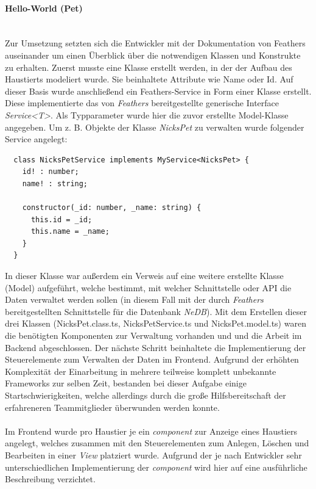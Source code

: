 \documentclass[10pt, a4paper]{article}
\begin{document}
\paragraph*{Hello-World (Pet)} $~$ \\
\label{HelloWorld}
Zur Umsetzung setzten sich die Entwickler mit der Dokumentation von Feathers auseinander um einen
Überblick über die notwendigen Klassen und Konstrukte zu erhalten. Zuerst musste eine Klasse erstellt werden, in der der Aufbau des Haustierts modeliert
wurde. Sie beinhaltete Attribute wie \glqq Name\grqq{} oder \glqq Id\grqq. Auf dieser Basis wurde anschließend ein Feathers-Service in Form einer
Klasse erstellt. Diese implementierte das von \textit{Feathers} bereitgestellte generische Interface \textit{Service<T>}. Als Typparameter wurde hier
die zuvor erstellte Model-Klasse angegeben. Um z. B. Objekte der Klasse \textit{NicksPet} zu verwalten wurde folgender Service angelegt:
\begin{lstlisting}
  class NicksPetService implements MyService<NicksPet> {
    id! : number;
    name! : string;

    constructor(_id: number, _name: string) {
      this.id = _id;
      this.name = _name;
    }
  }
\end{lstlisting}
In dieser Klasse war außerdem ein Verweis auf eine weitere erstellte Klasse (Model) aufgeführt, welche bestimmt, mit welcher Schnittstelle oder API die Daten
verwaltet werden sollen (in diesem Fall mit der durch \textit{Feathers} bereitgestellten Schnittstelle für die Datenbank \textit{NeDB}).
Mit dem Erstellen dieser drei Klassen (NicksPet.class.ts, NicksPetService.ts und NicksPet.model.ts) waren die benötigten Komponenten zur Verwaltung vorhanden und
und die Arbeit im Backend abgeschlossen. Der nächste Schritt beinhaltete die Implementierung der Steuerelemente zum Verwalten der Daten im Frontend.
Aufgrund der erhöhten Komplexität der Einarbeitung in mehrere teilweise komplett unbekannte Frameworks zur selben Zeit, bestanden bei dieser Aufgabe
einige Startschwierigkeiten, welche allerdings durch die große Hilfsbereitschaft der erfahreneren Teammitglieder überwunden werden konnte.
\\~\\
Im Frontend wurde pro Haustier je ein \textit{component} zur Anzeige eines Haustiers angelegt,
welches zusammen mit den Steuerelementen zum Anlegen, Löschen und Bearbeiten in einer \textit{View} platziert wurde.
Aufgrund der je nach Entwickler sehr unterschiedlichen Implementierung der \textit{component} wird hier auf eine ausführliche Beschreibung verzichtet.
\end{document}
